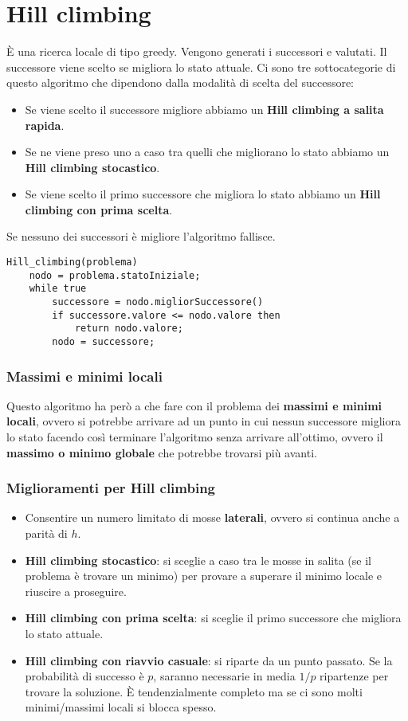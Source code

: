 \section{Hill climbing}
\`E una ricerca locale di tipo greedy. Vengono generati i successori e valutati. Il successore
viene scelto se migliora lo stato attuale. Ci sono tre sottocategorie di questo algoritmo che
dipendono dalla modalit\`a di scelta del successore:
\begin{itemize}
	\item Se viene scelto il successore migliore abbiamo un \textbf{Hill climbing a salita rapida}.
	\item Se ne viene preso uno a caso tra quelli che migliorano lo stato abbiamo un
	      \textbf{Hill climbing stocastico}.
	\item Se viene scelto il primo successore che migliora lo stato abbiamo un
	      \textbf{Hill climbing con prima scelta}.
\end{itemize}
Se nessuno dei successori \`e migliore l'algoritmo fallisce.

\begin{lstlisting}[style=pseudo-style]
Hill_climbing(problema)
	nodo = problema.statoIniziale;
	while true
		successore = nodo.migliorSuccessore()
		if successore.valore <= nodo.valore then
			return nodo.valore;
		nodo = successore;
\end{lstlisting}

\subsubsection{Massimi e minimi locali}
Questo algoritmo ha per\`o a che fare con il problema dei \textbf{massimi e minimi locali}, ovvero
si potrebbe arrivare ad un punto in cui nessun successore migliora lo stato facendo cos\`i terminare
l'algoritmo senza arrivare all'ottimo, ovvero il \textbf{massimo o minimo globale} che potrebbe
trovarsi pi\`u avanti.

\subsubsection{Miglioramenti per Hill climbing}
\begin{itemize}
	\item Consentire un numero limitato di mosse \textbf{laterali}, ovvero si continua anche
	      a parit\`a di $h$.
	\item \textbf{Hill climbing stocastico}: si sceglie a caso tra le mosse in salita (se il problema
	      \`e trovare un minimo) per provare a superare il minimo locale e riuscire a proseguire.
	\item \textbf{Hill climbing con prima scelta}: si sceglie il primo successore che migliora lo stato
	      attuale.
	\item \textbf{Hill climbing con riavvio casuale}: si riparte da un punto passato. Se la probabilit\`a
	      di successo \`e $p$, saranno necessarie in media $1 / p$ ripartenze per trovare la soluzione.
	      \`E tendenzialmente completo ma se ci sono molti minimi/massimi locali si blocca spesso.
\end{itemize}

